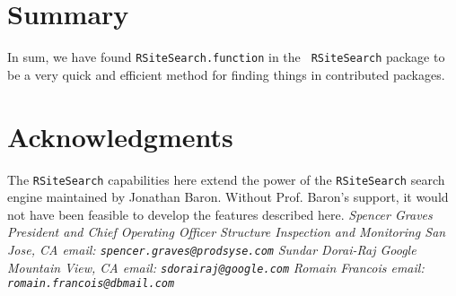 \section*{Summary}
In sum, we have found {\tt RSiteSearch.function} in the {\tt
RSiteSearch} package to be a very quick and efficient method for
finding things in contributed packages.

\section*{Acknowledgments}
The {\tt RSiteSearch} capabilities here extend the power of the
{\tt RSiteSearch} search engine maintained by Jonathan Baron.
Without Prof. Baron's support, it would not have been feasible
to develop the features described here.
\newline \newline
\emph{Spencer Graves \newline
President and Chief Operating Officer \newline
Structure Inspection and Monitoring \newline
San Jose, CA \newline
email:  {\tt spencer.graves@prodsyse.com} }
\newline \newline
\emph{Sundar Dorai-Raj \newline
Google \newline
Mountain View, CA \newline
email:  {\tt sdorairaj@google.com} }
\newline \newline
\emph{Romain Francois \newline
\newline
\newline
email:  {\tt romain.francois@dbmail.com} }

